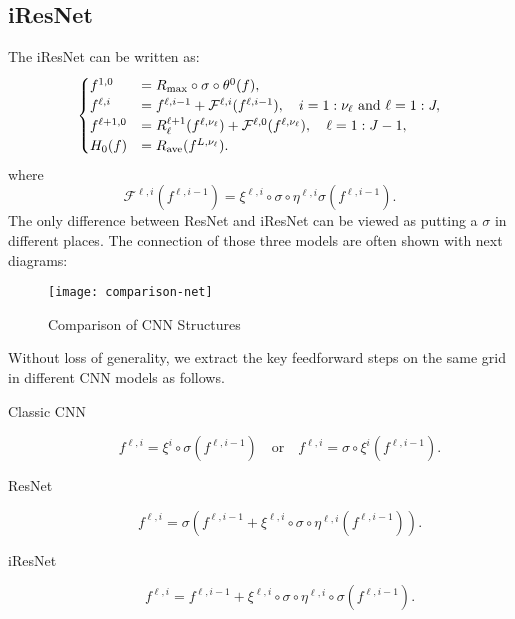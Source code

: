 \subsection{iResNet} 
	The iResNet\cite{he2016identity} can be written as:
	\begin{equation}\label{eq:iResNet1}
	\begin{cases}
	f^{1,0} &=R_{\rm max}\circ \sigma \circ \theta^0(f), \\
	f^{\ell,i} &= f^{\ell, i-1} + \mathcal{F}^{\ell, i} (f^{\ell,i-1}), \quad i = 1:\nu_\ell ~\text{and}~ \ell = 1:J ,\\
	f^{\ell+1,0} &=  R_\ell^{\ell+1} (f^{\ell, \nu_\ell} )+ \mathcal{F}^{\ell, 0} (f^{\ell, \nu_\ell} ) , \quad \ell = 1:J-1,\\
	H_0(f) &=  R_{\rm ave}(f^{L,\nu_\ell}). \\
	\end{cases}
	\end{equation}
	where
	$$
	\mathcal{F}^{\ell,i} (f^{\ell,i -1}) = \xi^{\ell,i} \circ \sigma \circ \eta^{\ell,i} \sigma (f^{\ell,i-1}).
	$$
	The only difference between ResNet and iResNet can be viewed as 
	putting a $\sigma$ in different places. 
	The connection of those three models are often shown with next diagrams:
	\begin{figure}[!htb]
		\begin{center}
			\texttt{[image: comparison-net]} 
		\end{center}
		\caption{Comparison of CNN Structures}
	\end{figure}
	

Without loss of generality, we extract the key 
feedforward steps on the same grid in different CNN models as follows.
\begin{description}
	\item[Classic CNN] 
	\begin{equation}\label{eq:cCNN}
	f^{\ell,i} = \xi^i \circ \sigma (f^{\ell,i-1}) \quad \text{or} \quad f^{\ell,i} = \sigma \circ \xi^{i} (f^{\ell,i-1}) .
	\end{equation}
	\item[ResNet] 
	\begin{equation}\label{eq:ResNet}
	f^{\ell,i} = \sigma( f^{\ell,i-1} + \xi^{\ell,i} \circ \sigma \circ \eta^{\ell,i}(f^{\ell,i-1})).
	\end{equation}
	\item[iResNet]
	\begin{equation}\label{eq:iResNet}
	f^{\ell,i} = f^{\ell,i-1} + \xi^{\ell,i} \circ \sigma \circ \eta^{\ell,i}\circ \sigma(f^{\ell,i-1}).
	\end{equation}
\end{description} 

